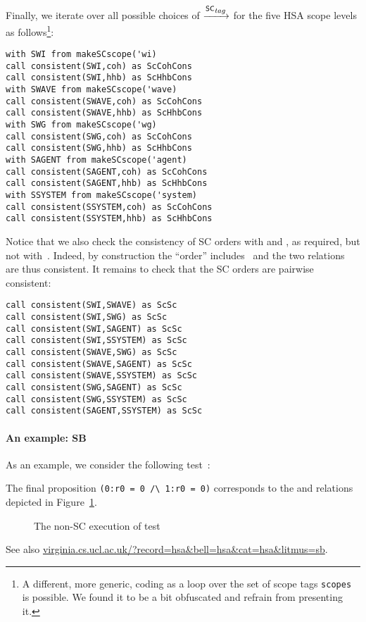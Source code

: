 \documentclass[a4paper]{article}
\begin{document}
Finally, we iterate over all possible choices of $\xrightarrow{\textsf{\scriptsize{}SC$_{\textsf{\scriptsize{}{\it\scriptsize{}tag}}}$}}$ for the five
HSA scope levels as follows\footnote{A different, more generic,
coding as a loop over the set of scope tags \texttt{scopes} is possible.
We found it to be a bit obfuscated and refrain from presenting it.}: 
\begin{verbatim}
with SWI from makeSCscope('wi)
call consistent(SWI,coh) as ScCohCons
call consistent(SWI,hhb) as ScHhbCons
with SWAVE from makeSCscope('wave)
call consistent(SWAVE,coh) as ScCohCons
call consistent(SWAVE,hhb) as ScHhbCons
with SWG from makeSCscope('wg)
call consistent(SWG,coh) as ScCohCons
call consistent(SWG,hhb) as ScHhbCons
with SAGENT from makeSCscope('agent)
call consistent(SAGENT,coh) as ScCohCons
call consistent(SAGENT,hhb) as ScHhbCons
with SSYSTEM from makeSCscope('system)
call consistent(SSYSTEM,coh) as ScCohCons
call consistent(SSYSTEM,hhb) as ScHhbCons
\end{verbatim}
Notice that we also check the consistency of SC orders with \coh{} and \hhb{},
as required, but not with~\po{}.  Indeed, by construction the ``order''
 includes~\po{} and the two relations are thus consistent.  It
remains to check that the SC orders are pairwise consistent:
\begin{verbatim}
call consistent(SWI,SWAVE) as ScSc
call consistent(SWI,SWG) as ScSc
call consistent(SWI,SAGENT) as ScSc
call consistent(SWI,SSYSTEM) as ScSc
call consistent(SWAVE,SWG) as ScSc
call consistent(SWAVE,SAGENT) as ScSc
call consistent(SWAVE,SSYSTEM) as ScSc
call consistent(SWG,SAGENT) as ScSc
call consistent(SWG,SSYSTEM) as ScSc
call consistent(SAGENT,SSYSTEM) as ScSc
\end{verbatim}

\paragraph{An example: SB}

As an example, we consider the following test~:

The final proposition \verb+(0:r0 = 0 /\ 1:r0 = 0)+ corresponds
to the \rf{} and \coh{} relations depicted in Figure~\ref{sbcoh}.
\begin{figure}[!h]
\vspace*{-2mm}
\begin{center}\moveback{}
\end{center}
\vspace*{-8mm}
\caption{\label{sbcoh}The non-SC execution of test~ \color{green}{(Allowed)}}
\end{figure}
See also \url{virginia.cs.ucl.ac.uk/?record=hsa&bell=hsa&cat=hsa&litmus=sb}.
\end{document}
